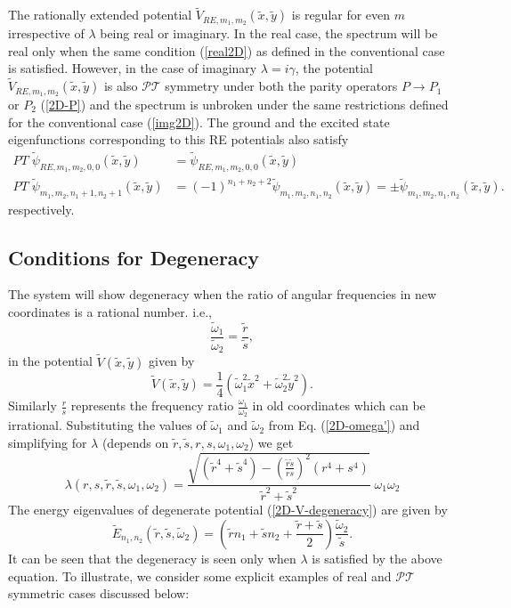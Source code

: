 \documentclass[a4paper, 12pt]{article}
\newcommand{\td}[1]{\tilde{#1}}
\begin{document}
The rationally extended potential $\td{V}_{RE,m_1,m_2}(\td{x},\td{y})$  is regular for even $m$ irrespective of $\lambda$ being real or imaginary. In the real case, the spectrum will be real only when the same condition (\ref{real2D}) as defined in the conventional case is satisfied. However, in the case of imaginary $\lambda=i\gamma$, the potential $\td{V}_{RE,m_1,m_2}(\td{x},\td{y})$ is also $\mathcal{PT}$ symmetry under both the parity operators $P\rightarrow P_1$ or $P_2$ (\ref{2D-P}) and the spectrum is unbroken under the same restrictions defined for the conventional case (\ref{img2D}). The ground and the excited state eigenfunctions corresponding to this RE potentials also satisfy
 \begin{align*}
 	PT\;\td{\psi}_{RE,m_1,m_2,0,0}(\td{x},\td{y}) &= \td{\psi}_{RE,m_1,m_2,0,0}(\td{x},\td{y})\\
 	PT\;\td{\psi}_{m_1,m_2,n_1+1,n_2+1}(\td{x},\td{y})&= (-1)^{n_1+n_2+2}\td{\psi}_{m_1,m_2,n_1,n_2}(\td{x},\td{y}) = \pm\td{\psi}_{m_1,m_2,n_1,n_2}(\td{x},\td{y}).
 \end{align*}    
respectively.


\subsection{Conditions for Degeneracy}
The system will show degeneracy when the ratio of angular frequencies in new coordinates is a rational number. i.e.,
\begin{equation}
  \frac{\td{\omega}_1}{\td{\omega}_2}=\frac{\td{r}}{\td{s}},
\end{equation}
in the potential $\td{V}(\td{x},\td{y})$ given by
\begin{equation}\label{2D-V-degeneracy}
  \td{V}(\td{x},\td{y})= \frac{1}{4}\left(\td{\omega}_1^2\td{x}^2+\td{\omega}_2^2\td{y}^2\right).
\end{equation}
Similarly $\frac{r}{s}$ represents the frequency ratio $\frac{\omega_1}{\omega_2}$ in old coordinates which can be irrational. Substituting the values of $\td{\omega}_1$ and $\td{\omega}_2$ from Eq. (\ref{2D-omega'}) and simplifying for $\lambda$ (depends on $\td{r},\td{s},r,s,\omega_1,\omega_2$) we get
\begin{equation}\label{2D-lambda}
  \lambda(r,s,\td{r},\td{s},\omega_1,\omega_2)=\frac{\sqrt{(\td{r}^4+\td{s}^4)-\left(\frac{\td{r}\td{s}}{rs}\right)^2(r^4+s^4)}}{\td{r}^2+\td{s}^2}\;\omega_1\omega_2
\end{equation}
The energy eigenvalues of degenerate potential (\ref{2D-V-degeneracy}) are given by
\begin{equation}\label{2D-degeneracy}
  \td{E}_{n_1,n_2}(\td{r},\td{s},\td{\omega}_2) = \left(\td{r} n_1+ \td{s} n_2+\frac{\td{r}+\td{s}}{2}\right)\frac{\td{\omega}_2}{\td{s}}.
\end{equation}
It can be seen that the degeneracy is seen only when $\lambda$ is satisfied by the above equation. To illustrate, we consider some explicit examples of real and $\mathcal{PT}$ symmetric cases discussed below:
\end{document}
